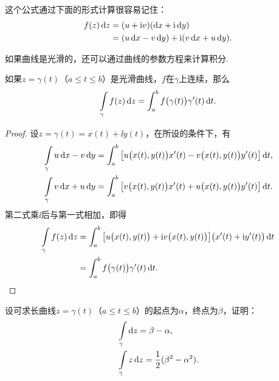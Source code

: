 这个公式通过下面的形式计算很容易记住：
\begin{align*}
  f(z)\mathop{}\!\mathrm dz & = (u+\mathrm i v)(\mathop{}\!\mathrm dx+\mathrm i\mathop{}\!\mathrm dy) \\
          & = (u\mathop{}\!\mathrm dx-v\mathop{}\!\mathrm dy)+\mathrm i(v\mathop{}\!\mathrm dx+u\mathop{}\!\mathrm dy).
\end{align*}

如果曲线是光滑的，还可以通过曲线的参数方程来计算积分.
\begin{prop}\label{prop3.1.2}
  如果$z=\gamma(t)$（$a\le t\le b$）是光滑曲线，$f$在$\gamma$上连续，那么
  \begin{equation}\label{eq3.1.3}
    \int\limits_\gamma f(z)\mathop{}\!\mathrm dz = \int_a^b f\big(\gamma(t)\big)\gamma'(t)\mathop{}\!\mathrm{d} t.
  \end{equation}
\end{prop}
\begin{proof}
  设$z=\gamma(t)=x(t)+\ii y(t)$，在所设的条件下，有
  \begin{align*}
    & \int\limits_\gamma u\mathop{}\!\mathrm dx-v\mathop{}\!\mathrm dy = \int_a^b\big[u\big(x(t),y(t)\big)x'(t)-v\big(x(t),y(t)\big)y'(t)\big]\mathop{}\!\mathrm{d} t,\\
    & \int\limits_\gamma v\mathop{}\!\mathrm dx+u\mathop{}\!\mathrm dy = \int_a^b\big[v\big(x(t),y(t)\big)x'(t)+u\big(x(t),y(t)\big)y'(t)\big]\mathop{}\!\mathrm{d} t.
  \end{align*}
  第二式乘$\ii$后与第一式相加，即得
  \begin{align*}
    \int\limits_\gamma f(z)\mathop{}\!\mathrm dz
    & = \int_a^b \big[u\big(x(t),y(t)\big)+\mathrm i v\big(x(t),y(t)\big)\big]\big(x'(t)+\mathrm i y'(t)\big)\mathop{}\!\mathrm{d} t\\
    & = \int_a^b f\big(\gamma(t)\big)\gamma'(t)\mathop{}\!\mathrm{d} t. \qedhere
  \end{align*}
\end{proof}
\begin{example}\label{exam3.1.3}
  设可求长曲线$z=\gamma(t)$（$a\le t\le b$）的起点为$\alpha$，终点为$\beta$，证明：
  \begin{align*}
    & \int\limits_\gamma\mathop{}\!\mathrm dz = \beta-\alpha,\\
    & \int\limits_\gamma z\mathop{}\!\mathrm dz = \frac12(\beta^2-\alpha^2).
  \end{align*}
\end{example}

